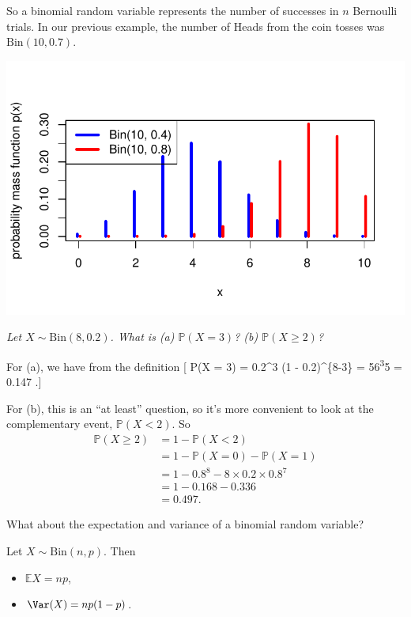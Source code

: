 \documentclass[
  letterpaper,
]{report}
\providecommand{\tightlist}{%
  \setlength{\itemsep}{0pt}\setlength{\parskip}{0pt}}\usepackage{longtable,booktabs,array}
\theoremstyle{definition}
\theoremstyle{definition}
\theoremstyle{remark}
\begin{document}
So a binomial random variable represents the number of successes in
\(n\) Bernoulli trials. In our previous example, the number of Heads
from the coin tosses was \(\text{Bin}(10, 0.7)\).

\includegraphics{sections/L11-binomial-geometric_files/figure-pdf/binom-pic-1.pdf}

\emph{Let \(X \sim \mathrm{Bin}(8, 0.2)\). What is (a)
\(\mathbb P(X = 3)\)? (b) \(\mathbb P(X \geq 2)\)?}

For (a), we have from the definition {[} \mathbb P(X = 3) = 
0.2\^{}3 (1 - 0.2)\^{}\{8-3\} =
56\textsuperscript{3}5 = 0.147 .{]}

For (b), this is an ``at least'' question, so it's more convenient to
look at the complementary event, \(\mathbb P(X < 2)\). So \begin{align*}
\mathbb P(X \geq 2) &= 1 - \mathbb P(X < 2) \\
  &= 1 - \mathbb P(X = 0) - \mathbb P(X = 1) \\
  &= 1 - 0.8^8 - 8\times 0.2 \times 0.8^7 \\
  &= 1 - 0.168 - 0.336 \\
  & = 0.497 .
\end{align*}

What about the expectation and variance of a binomial random variable?

Let \(X \sim \text{Bin}(n, p)\). Then

\begin{itemize}
\tightlist
\item
  \(\mathbb EX = np\),
\item
  \(\Var(X) =np(1-p)\).
\end{itemize}
\end{document}

